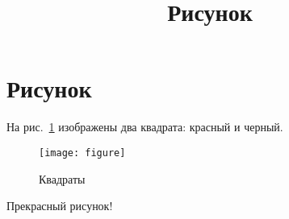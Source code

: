 \documentclass[a4paper,12pt]{article}
\title{Рисунок}
\begin{document}
\section*{Рисунок}

На рис.~\ref{squares} изображены два квадрата: красный и черный.

\begin{figure}[bhtp]
\centering
\texttt{[image: figure]}
\caption{Квадраты}\label{squares}
\end{figure}

Прекрасный рисунок!
\end{document}
